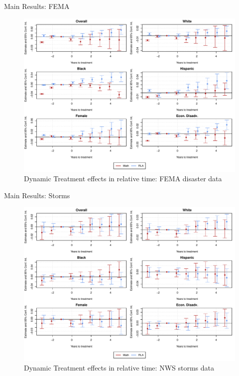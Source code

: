 \documentclass[hyperref={colorlinks = true,linkcolor = blue, citecolor=blue,urlcolor=blue}]{beamer}
\begin{document}
\begin{frame}{Main Results: FEMA}
	\begin{figure}[!h]
		\centering
		\includegraphics[scale=0.45]{"../Code & Data/ResultsPlotPresentation.pdf"}
		\caption{Dynamic Treatment effects in relative time: FEMA disaster data}
	\end{figure}
\end{frame}


\begin{frame}{Main Results: Storms}
	\begin{figure}[!h]
		\centering
		\includegraphics[scale=0.45]{"../Code & Data/ResultsPlotStormPresentation.pdf"}
		\caption{Dynamic Treatment effects in relative time: NWS storms data}
	\end{figure}
\end{frame}
\end{document}
